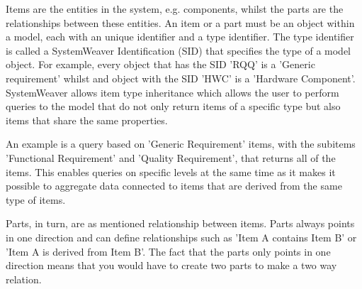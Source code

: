 \documentclass[conference]{IEEEtran}
\begin{document}
Items are the entities in the system, e.g. components, whilst the parts are the relationships between these entities. %
An item or a part must be an object within a model, each with an unique identifier and a type identifier. 
The type identifier is called a SystemWeaver Identification (SID) that specifies the type of a model object.
For example, every object that has the SID 'RQQ' is a 'Generic requirement' whilst and object with the SID 'HWC' is a 'Hardware Component'.
SystemWeaver allows item type inheritance which allows the user to perform queries to the model that do not only return items of a specific type but also items that share the same properties. 


An example is a query based on 'Generic Requirement' items, with the subitems 'Functional Requirement' and 'Quality Requirement', that returns all of the items. This enables queries on specific levels at the same time as it makes it possible to aggregate data connected to items that are derived from the same type of items.

Parts, in turn, are as mentioned relationship between items. 
Parts always points in one direction and can define relationships such as 'Item A contains Item B' or 'Item A is derived from Item B'. The fact that the parts only points in one direction means that you would have to create two parts to make a two way relation.
\end{document}
